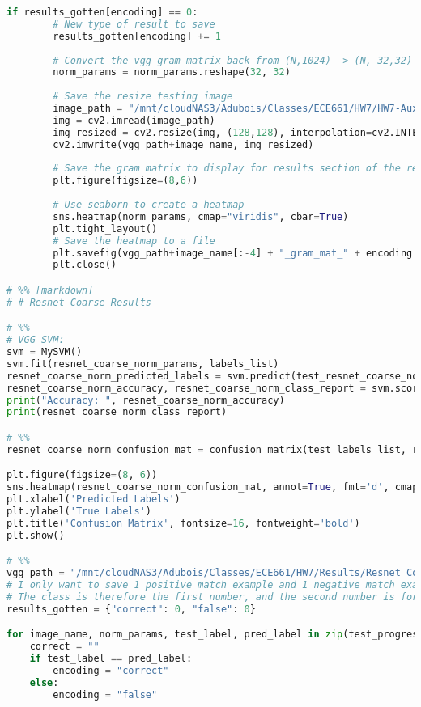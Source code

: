 \documentclass{article}
\begin{document}
\begin{lstlisting}[language=Python]
    if results_gotten[encoding] == 0:
        # New type of result to save
        results_gotten[encoding] += 1
        
        # Convert the vgg_gram_matrix back from (N,1024) -> (N, 32,32) for display
        norm_params = norm_params.reshape(32, 32)
        
        # Save the resize testing image
        image_path = "/mnt/cloudNAS3/Adubois/Classes/ECE661/HW7/HW7-Auxilliary/data/testing/" + image_name
        img = cv2.imread(image_path)
        img_resized = cv2.resize(img, (128,128), interpolation=cv2.INTER_AREA)
        cv2.imwrite(vgg_path+image_name, img_resized)
        
        # Save the gram matrix to display for results section of the report
        plt.figure(figsize=(8,6))
        
        # Use seaborn to create a heatmap
        sns.heatmap(norm_params, cmap="viridis", cbar=True)
        plt.tight_layout()
        # Save the heatmap to a file
        plt.savefig(vgg_path+image_name[:-4] + "_gram_mat_" + encoding + ".png", format='png', dpi=300, bbox_inches="tight")
        plt.close()

# %% [markdown]
# # Resnet Coarse Results

# %%
# VGG SVM:
svm = MySVM()
svm.fit(resnet_coarse_norm_params, labels_list)
resnet_coarse_norm_predicted_labels = svm.predict(test_resnet_coarse_norm_params)
resnet_coarse_norm_accuracy, resnet_coarse_norm_class_report = svm.score(resnet_coarse_norm_predicted_labels, test_labels_list)
print("Accuracy: ", resnet_coarse_norm_accuracy)
print(resnet_coarse_norm_class_report)

# %%
resnet_coarse_norm_confusion_mat = confusion_matrix(test_labels_list, resnet_coarse_norm_predicted_labels)

plt.figure(figsize=(8, 6))
sns.heatmap(resnet_coarse_norm_confusion_mat, annot=True, fmt='d', cmap='Blues', cbar=False)
plt.xlabel('Predicted Labels')
plt.ylabel('True Labels')
plt.title('Confusion Matrix', fontsize=16, fontweight='bold')
plt.show()

# %%
vgg_path = "/mnt/cloudNAS3/Adubois/Classes/ECE661/HW7/Results/Resnet_Coarse_Bonus_Results/"
# I only want to save 1 positive match example and 1 negative match example for each class
# The class is therefore the first number, and the second number is for matching labels or not
results_gotten = {"correct": 0, "false": 0}

for image_name, norm_params, test_label, pred_label in zip(test_progress_bar, test_resnet_coarse_norm_params, test_labels_list, resnet_coarse_norm_predicted_labels):
    correct = ""
    if test_label == pred_label:
        encoding = "correct"
    else:
        encoding = "false"
    

\end{lstlisting}
\end{document}
